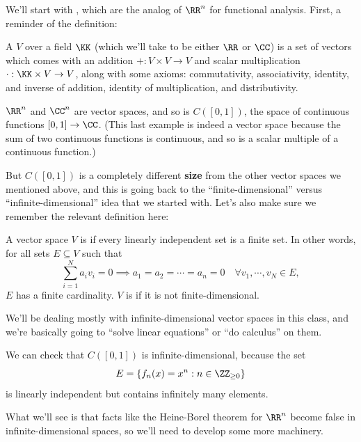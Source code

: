 We'll start with , which are the analog of $\RR^n$ for functional analysis. First, a reminder of the definition:

\begin{definition}
A  $V$ over a field $\KK$ (which we'll take to be either $\RR$ or $\CC$) is a set of vectors which comes with an addition $+: V \times V \to V$ and scalar multiplication $\cdot: \KK \times V \to V$, along with some axioms: commutativity, associativity, identity, and inverse of addition, identity of multiplication, and distributivity.
\end{definition}

\begin{example}
$\RR^n$ and $\CC^n$ are vector spaces, and so is $C([0, 1])$, the space of continuous functions $[0, 1] \to \CC$. (This last example is indeed a vector space because the sum of two continuous functions is continuous, and so is a scalar multiple of a continuous function.)
\end{example}

But $C([0, 1])$ is a completely different \textbf{size} from the other vector spaces we mentioned above, and this is going back to the ``finite-dimensional'' versus ``infinite-dimensional'' idea that we started with. Let's also make sure we remember the relevant definition here:

\begin{definition}
A vector space $V$ is  if every linearly independent set is a finite set. In other words, for all sets $E \subseteq V$ such that 
\[
    \sum_{i=1}^N a_iv_i = 0 \implies a_1 = a_2 = \cdots = a_n = 0 \quad \forall v_1, \cdots, v_N \in E,
\]
$E$ has a finite cardinality. $V$ is  if it is not finite-dimensional.
\end{definition}

We'll be dealing mostly with infinite-dimensional vector spaces in this class, and we're basically going to ``solve linear equations'' or ``do calculus'' on them.

\begin{example}
We can check that $C([0, 1])$ is infinite-dimensional, because the set
\[
    E = \{f_n(x) = x^n: n \in \ZZ_{\ge 0}\}
\]
is linearly independent but contains infinitely many elements. 
\end{example}

What we'll see is that facts like the Heine-Borel theorem for $\RR^n$ become false in infinite-dimensional spaces, so we'll need to develop some more machinery.

